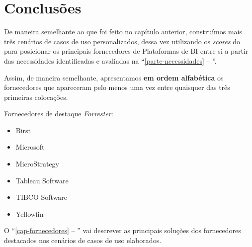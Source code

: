 \section{Conclusões}
\label{sec-conclusoes-forrester}

De maneira semelhante ao que foi feito no capítulo anterior, construímos mais três cenários de casos de uso personalizados, dessa vez utilizando os \emph{scores} do \relFCM \xspace para posicionar os principais fornecedores de Plataformas de BI entre si a partir das necessidades identificadas e avaliadas na ``\autoref{parte-necessidades} -- ''.

Assim, de maneira semelhante, apresentamos \textbf{em ordem alfabética} os fornecedores que apareceram pelo menos uma vez entre quaisquer das três primeiras colocações.

\begin{env-destaque}{Fornecedores de destaque \emph{Forrester}:}
 \begin{multicols}{2}
    \begin{itemize}
        \item Birst
        \item Microsoft
        \item MicroStrategy
        \item Tableau Software
        \item TIBCO Software
        \item Yellowfin
    \end{itemize}
 \end{multicols}
\end{env-destaque}

O ``\autoref{cap-fornecedores} -- '' vai descrever as principais soluções dos fornecedores destacados nos cenários de casos de uso elaborados.